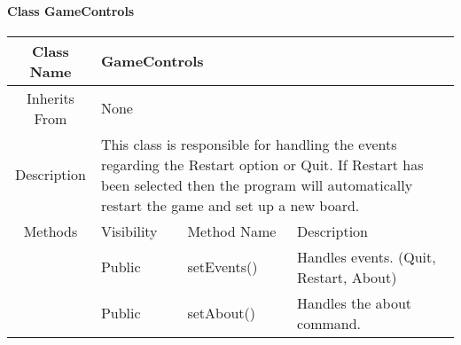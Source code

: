 \paragraph{Class GameControls}\mbox{}
\begin{tabularx}{\textwidth}{|c||l|l|l|X|}
    \hline
    \cellcolor{lightgray}Class Name & \multicolumn{4}{X|}{GameControls}\\
    \hline
    \cellcolor{lightgray}Inherits From & \multicolumn{4}{X|}{None}\\
    \hline
    \cellcolor{lightgray}Description & \multicolumn{4}{p{12cm}|}{This class is responsible for handling the events regarding the Restart option or Quit. If Restart has been selected then the program will automatically restart the game and set up a new board.}\\
    \hline\hline
    
    \cellcolor{lightgray}Methods & \cellcolor{lightgray}Visibility & \multicolumn{2}{l|}{\cellcolor{lightgray}Method Name} & \cellcolor{lightgray}Description\\\cline{2-5}
    \cellcolor{lightgray} & Public & \multicolumn{2}{l|}{setEvents()} & Handles events. (Quit, Restart, About)\\\cline{2-5}
    \cellcolor{lightgray} & Public & \multicolumn{2}{l|}{setAbout()} & Handles the about command.\\\cline{2-5}
    \hline
\end{tabularx}
